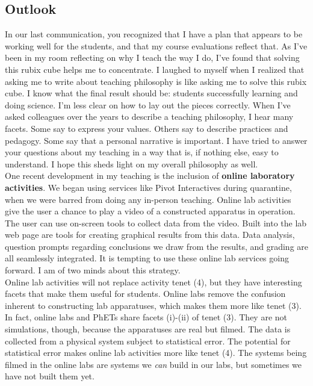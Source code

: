 \documentclass[../../../main.tex]{subfiles}
\begin{document}
\subsection{Outlook}

In our last communication, you recognized that I have a plan that appears to be working well for the students, and that my course evaluations reflect that.  As I've been in my room reflecting on why I teach the way I do, I've found that solving this rubix cube helps me to concentrate.  I laughed to myself when I realized that asking me to write about teaching philosophy is like asking me to solve this rubix cube.  I know what the final result should be: students successfully learning and doing science.  I'm less clear on how to lay out the pieces correctly.  When I've asked colleagues over the years to describe a teaching philosophy, I hear many facets.  Some say to express your values.  Others say to describe practices and pedagogy.  Some say that a personal narrative is important.  I have tried to answer your questions about my teaching in a way that is, if nothing else, easy to understand.  I hope this sheds light on my overall philosophy as well.
\\
\vspace{0.25cm}
One recent development in my teaching is the inclusion of \textbf{online laboratory activities}.  We began using services like Pivot Interactives during quarantine, when we were barred from doing any in-person teaching.  Online lab activities give the user a chance to play a video of a constructed apparatus in operation.  The user can use on-screen tools to collect data from the video.  Built into the lab web page are tools for creating graphical results from this data.  Data analysis, question prompts regarding conclusions we draw from the results, and grading are all seamlessly integrated.  It is tempting to use these online lab services going forward.  I am of two minds about this strategy.
\\
\vspace{0.25cm}
Online lab activities will not replace activity tenet (4), but they have interesting facets that make them useful for students.  Online labs remove the confusion inherent to constructing lab apparatuses, which makes them more like tenet (3).  In fact, online labs and PhETs share facets (i)-(ii) of tenet (3).  They are not simulations, though, because the apparatuses are real but filmed.  The data is collected from a physical system subject to statistical error.  The potential for statistical error makes online lab activities more like tenet (4).  The systems being filmed in the online labs are systems we \textit{can} build in our labs, but sometimes we have not built them yet.
\end{document}

